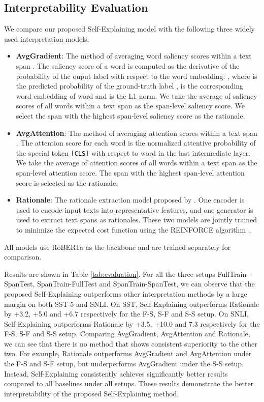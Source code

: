 \documentclass[11pt,a4paper]{article}
\begin{document}
\subsection{Interpretability Evaluation}
We compare our proposed Self-Explaining model with the following three widely used interpretation models:
\begin{itemize}
    \item {\bf AvgGradient}: The method of averaging word saliency scores within a text span \citep{li2015visualizing,feng2018pathologies}.
    The saliency score of a word  is computed as the derivative of the probability of the ouput label with respect to the word embedding: , where  is the predicted probability of the ground-truth label ,  is the corresponding word embedding of word  and  is the L1 norm. We take the average of saliency scores of all words within a text span as the span-level saliency score. We select the span with the highest span-level saliency score as the rationale.
    \item {\bf AvgAttention}: The method of averaging attention scores within a text span \citep{vig2019analyzing,tenney2019bert,clark2019does}. The attention score for each word  is the normalized attentive probability of the special token \texttt{[CLS]} with respect to
    word
      in the last intermediate layer. We take the average of attention scores of all words within a text span as the span-level attention score. The span with the highest 
     span-level 
     attention score is selected as the rationale.
    \item {\bf Rationale}: The rationale extraction model proposed by \citet{lei2016rationalizing}. One encoder is used to encode input texts into representative features, and one generator is used to extract text spans as rationales. These two models are jointly trained to minimize the expected cost function using the REINFORCE algorithm \citep{DBLP:journals/ml/Williams92}.

\end{itemize}
All models use RoBERTa \citep{yinhan2019roberta} as the backbone and are trained separately for comparison.

Results are shown in Table \ref{tab:evaluation}. For all the three setups FullTrain-SpanTest, SpanTrain-FullTest and SpanTrain-SpanTest, we can observe that the proposed Self-Explaining outperforms other interpretation methods by a large margin on both SST-5 and SNLI. On SST, Self-Explaining outperforms Rationale by +3.2, +5.0 and +6.7 respectively for the F-S, S-F and S-S setup. On SNLI, Self-Explaining outperforms Rationale by +3.5, +10.0 and 7.3 respectively for the F-S, S-F and S-S setup. 
Comparing AvgGradient, AvgAttention and Rationale, we can see that there is no method that shows consistent  superiority to the other two. For example, Rationale outperforms AvgGradient and AvgAttention under the F-S and S-F setup, but underperforms AvgGradient under the S-S setup. Instead, Self-Explaining consistently achieves significantly better results compared to all baselines  under all setups.
These results demonstrate the better interpretability of the proposed Self-Explaining method.
\end{document}
